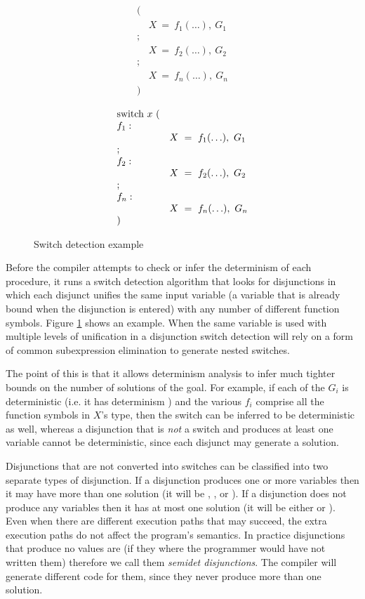 \begin{figure}
\parbox{0.5\textwidth}{
$$
\begin{array}{ll}
(\\
& X~=~f_1(\ldots),~G_1 \\
; \\
& X~=~f_2(\ldots),~G_2 \\
; \\
& X~=~f_n(\ldots),~G_n \\
)
\end{array}
$$}%
\parbox{0.5\textwidth}{
$$
\begin{array}{ll}
\hbox{switch}~x~( \\
f_1: \\
& X~=~f_1(\ldots),~G_1 \\
; \\
f_2: \\
& X~=~f_2(\ldots),~G_2 \\
; \\
f_n: \\
& X~=~f_n(\ldots),~G_n \\
)
\end{array}
$$}
\caption{Switch detection example}
\label{fig:switch_detect}
\end{figure}

Before the compiler attempts to check or infer
the determinism of each procedure,
it runs a switch detection algorithm that looks for disjunctions
in which each disjunct unifies the same input variable
(a variable that is already bound when the disjunction is entered)
with any number of different function symbols.
Figure \ref{fig:switch_detect} shows an example.
When the same variable is used with multiple levels of unification in a
disjunction switch detection will rely on
a form of common subexpression elimination
to generate nested switches.

The point of this is that it allows determinism analysis
to infer much tighter bounds on the number of solutions of the goal.
For example, if each of the $G_i$ is deterministic
(i.e. it has determinism \ddet)
and the various $f_i$ comprise all the function symbols in $X$'s type,
then the switch can be inferred to be deterministic as well,
whereas a disjunction that is \emph{not} a switch and produces at least one
variable
cannot be deterministic,
since each disjunct may generate a solution.

Disjunctions that are not converted into switches can be classified into two
separate types of disjunction.
If a disjunction produces one or more variables
then it may have more than one solution
(it will be \dnondet, \dmulti, \dccnondet or \dccmulti).
If a disjunction does not produce any variables
then it has at most one solution
(it will be either \dsemidet or \ddet).
Even when there are different execution paths that may succeed,
the extra execution paths do not affect the program's semantics.
In practice disjunctions that produce no values are \dsemidet
(if they where \ddet the programmer would have not written them)
therefore we call them \emph{semidet disjunctions}.
The compiler will generate different code for them,
since they never produce more than one solution.

